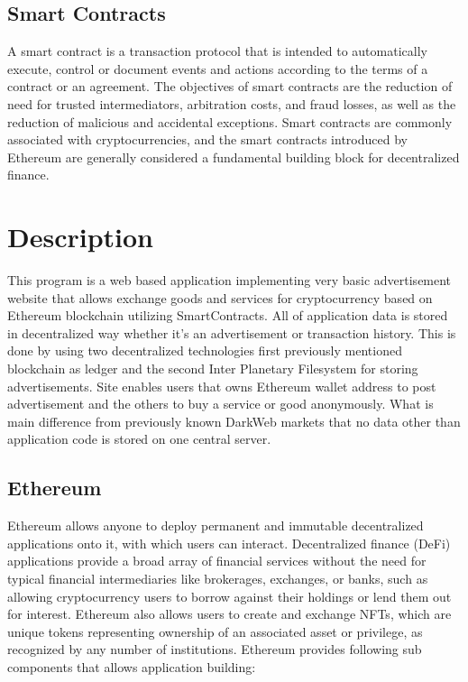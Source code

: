 \documentclass[journal]{IEEEtran} %
\begin{document}
    \subsection{Smart Contracts}
    A smart contract is a transaction protocol that is intended to automatically execute, control or document events and actions according to the terms of a contract or an agreement. The objectives of smart contracts are the reduction of need for trusted intermediators, arbitration costs, and fraud losses, as well as the reduction of malicious and accidental exceptions. Smart contracts are commonly associated with cryptocurrencies, and the smart contracts introduced by Ethereum are generally considered a fundamental building block for decentralized finance.\\

\section{Description}
This program is a web based application implementing very basic advertisement website that allows exchange goods and services for cryptocurrency based on Ethereum blockchain utilizing SmartContracts. All of application data is stored in decentralized way whether it's an advertisement or transaction history. This is done by using two decentralized technologies first previously mentioned blockchain as ledger and the second Inter Planetary Filesystem for storing advertisements. Site enables users that owns Ethereum wallet address to post advertisement and the others to buy a service or good anonymously. What is main difference from previously known DarkWeb markets that no data other than application code is stored on one central server.

    \subsection{Ethereum}
        Ethereum allows anyone to deploy permanent and immutable decentralized applications onto it, with which users can interact. Decentralized finance (DeFi) applications provide a broad array of financial services without the need for typical financial intermediaries like brokerages, exchanges, or banks, such as allowing cryptocurrency users to borrow against their holdings or lend them out for interest. Ethereum also allows users to create and exchange NFTs, which are unique tokens representing ownership of an associated asset or privilege, as recognized by any number of institutions. Ethereum provides following sub components that allows application building:\\
\end{document}
